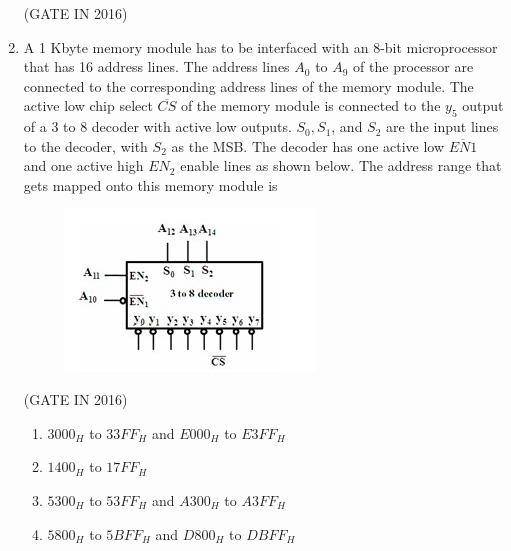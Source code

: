 \documentclass[journal,12pt,onecolumn]{IEEEtran}
\theoremstyle{remark}
\begin{document}
\begin{enumerate}
\hfill{(GATE IN 2016)}
\begin{enumerate}
\end{enumerate}

\item A 1 Kbyte memory module has to be interfaced with an 8-bit microprocessor that has 16 address lines. The address lines $A_0$ to $A_9$ of the processor are connected to the corresponding address lines of the memory module. The active low chip select $\overline{CS}$ of the memory module is connected to the $y_5$ output of a 3 to 8 decoder with active low outputs. $S_0, S_1$, and $S_2$ are the input lines to the decoder, with $S_2$ as the MSB. The decoder has one active low $\overline{EN1}$ and one active high $EN_2$ enable lines as shown below. The address range that gets mapped onto this memory module is 
\begin{figure}[H]
\centering
\includegraphics[width=0.6\columnwidth]{figs/z25.jpg}
\caption*{}
\label{fig:z25}
\end{figure}

\hfill{(GATE IN 2016)}
\begin{enumerate}

\item $3000_H$ to $33FF_H$ and $E000_H$ to $E3FF_H$
\item $1400_H$ to $17FF_H$
\item $5300_H$ to $53FF_H$ and $A300_H$ to $A3FF_H$
\item $5800_H$ to $5BFF_H$ and $D800_H$ to $DBFF_H$

\end{enumerate}


\end{enumerate}
\end{document}
